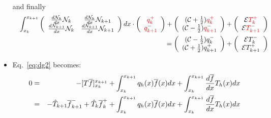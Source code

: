 \begin{itemize}
\begin{itemize}
\end{itemize}

and finally 
\begin{eqnarray}
&&\int_{x_k}^{x_{k+1}} 
\left(
\begin{array}{cc}
\frac{d{\mathcal{N}}_k}{dx} {\mathcal{N}}_k     & \frac{d{\mathcal{N}}_k}{dx} {\mathcal{N}}_{k+1} \\
\frac{d{\mathcal{N}}_{k+1}}{dx} {\mathcal{N}}_k & \frac{d{\mathcal{N}}_{k+1}}{dx} {\mathcal{N}}_{k+1}
\end{array}
\right)dx  \cdot
\left(
\begin{array}{c}
    {\color{red}q_k^+}  \\
    {\color{red}q_{k+1}^-}
\end{array}
\right)
+\left(
\begin{array}{c}
     ({\cal C}+\frac{1}{2})  {\color{red}q_k^+}  \\
     ({\cal C}-\frac{1}{2})  {\color{red}q_{k+1}^-} 
\end{array}
\right)+\left(
\begin{array}{c}
     {\cal E}    {\color{red}T_k^+}  \\
     {\cal E}    {\color{red}T_{k+1}^-} 
\end{array}
\right) \nonumber \\
&&= 
\left(
\begin{array}{c}
     ({\cal C}-\frac{1}{2}) q_k^-  \\
     ({\cal C}+\frac{1}{2}) q_{k+1}^+ 
\end{array}
\right)
+ \left(
\begin{array}{c}
     {\cal E}   T_k^-  \\
     {\cal E}   T_{k+1}^+
\end{array}
\right)  
\label{eq:dgq1}
\end{eqnarray}



\newpage
\item Eq.~\ref{eq:dg2} becomes:
\begin{eqnarray}
0&=&
-[ T \overline{f}  ]_{x_k}^{x_{k+1}} 
+ \int_{x_k}^{x_{k+1}}  q_h(x) \overline{f}(x) dx
+ \int_{x_k}^{x_{k+1}} \frac{d\overline{f}}{dx} T_h(x) dx  
\nonumber\\
&=&
-\hat{T}_{k+1} \overline{f}_{k+1}^- 
+\hat{T}_k     \overline{f}_{k}^+ 
+ \int_{x_k}^{x_{k+1}}  q_h(x) \overline{f}(x) dx
+ \int_{x_k}^{x_{k+1}} \frac{d\overline{f}}{dx} T_h(x) dx  \nonumber
\end{eqnarray}



\end{itemize}
